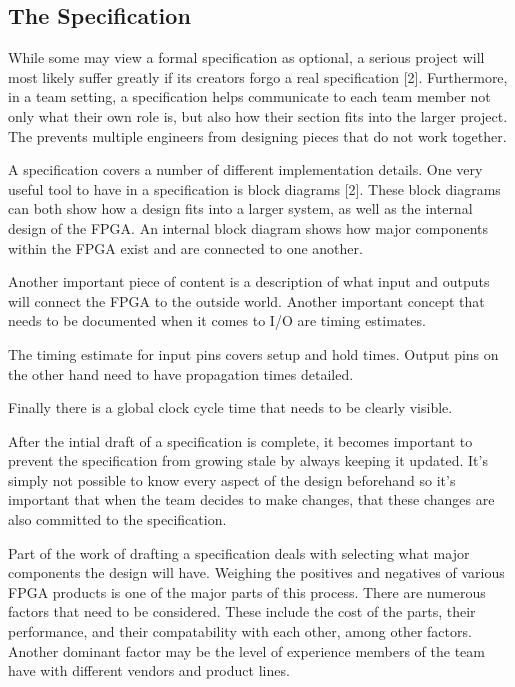 \documentclass{article}
\begin{document}
    \subsection{The Specification}

    While some may view a formal specification as optional, a serious project
    will most likely suffer greatly if its creators forgo a real specification [2].
    Furthermore, in a team setting, a specification helps communicate to each team
    member not only what their own role is, but also how their section fits into the
    larger project. The prevents multiple engineers from designing pieces that
    do not work together.

    A specification covers a number of different implementation details.
    One very useful tool to have in a specification is block diagrams [2].
    These block diagrams can both show how a design fits into a larger system,
    as well as the internal design of the FPGA. An internal block diagram shows
    how major components within the FPGA exist and are connected to one another.

    Another important piece of content is a description of what input and outputs
    will connect the FPGA to the outside world. Another important concept that
    needs to be documented when it comes to I/O are timing estimates.

    The timing estimate for input pins covers setup and hold times.
    Output pins on the other hand need to have propagation times detailed.

    Finally there is a global clock cycle time that needs to be clearly visible.

    After the intial draft of a specification is complete, it becomes important
    to prevent the specification from growing stale by always keeping it updated.
    It's simply not possible to know every aspect of the design beforehand so
    it's important that when the team decides to make changes, that these changes
    are also committed to the specification.

    Part of the work of drafting a specification deals with selecting what major components
    the design will have. Weighing the positives and negatives of various FPGA products
    is one of the major parts of this process. There are numerous factors that need to be
    considered. These include the cost of the parts, their performance, and their compatability
    with each other, among other factors. Another dominant factor may be
    the level of experience members of the team have with different vendors and product lines.
\end{document}
